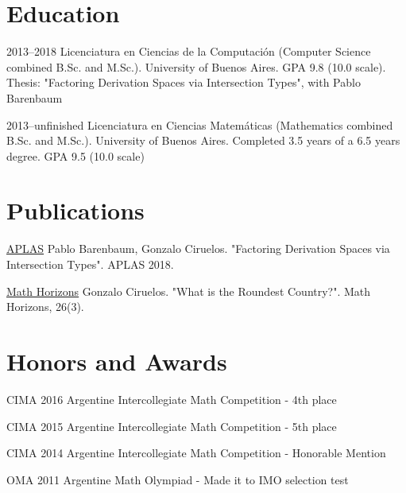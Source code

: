 \documentclass[a4paper,english,10pt]{article}
\begin{document}
\section{Education}
\begin{CV}
\item[2013--2018] Licenciatura en Ciencias de la Computación (Computer Science combined B.Sc. and M.Sc.). University of Buenos Aires. GPA 9.8 (10.0 scale). Thesis: "Factoring Derivation Spaces via Intersection Types", with Pablo Barenbaum
\item[2013--unfinished] Licenciatura en Ciencias Matemáticas (Mathematics combined B.Sc. and M.Sc.). University of Buenos Aires. Completed 3.5 years of a 6.5 years degree. GPA 9.5 (10.0 scale)
\end{CV}


\section{Publications}
\begin{CV}
\item[\href{https://doi.org/10.1007/978-3-030-02768-1_2}{APLAS}] Pablo Barenbaum, Gonzalo Ciruelos. "Factoring Derivation Spaces via Intersection Types". APLAS 2018.
\item[\href{https://doi.org/10.1080/10724117.2018.1524089}{Math Horizons}] Gonzalo Ciruelos. "What is the Roundest Country?".  Math Horizons, 26(3).
\end{CV}


\section{Honors and Awards}
\begin{CV}
\item [CIMA 2016] Argentine Intercollegiate Math Competition - 4th place
\item [CIMA 2015] Argentine Intercollegiate Math Competition - 5th place
\item [CIMA 2014] Argentine Intercollegiate Math Competition - Honorable Mention
\item [OMA 2011] Argentine Math Olympiad - Made it to IMO selection test
\end{CV}
\end{document}

